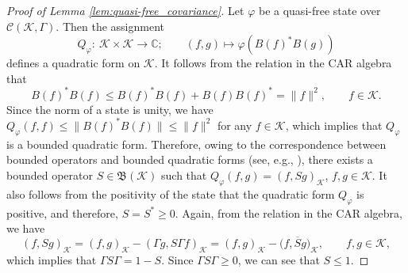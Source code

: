 \documentclass[pdftex]{sigma}
\numberwithin{equation}{section}
\newcommand{\mfrak}[1]{\mathfrak{#1}}
\newcommand{\mcal}[1]{\mathcal{#1}}
\newcommand{\mbb}[1]{\mathbb{#1}}
\begin{document}
\begin{proof}[Proof of Lemma \ref{lem:quasi-free_covariance}]
Let $\varphi$ be a quasi-free state over $\mcal{C}(\mcal{K},\Gamma)$.
Then the assignment
\begin{equation*}
	Q_{\varphi}\colon \ \mcal{K}\times \mcal{K}\to\mbb{C};\qquad (f,g)\mapsto \varphi (B(f)^{\ast}B(g))
\end{equation*}
defines a quadratic form on $\mcal{K}$.
It follows from the relation in the CAR algebra that
\begin{equation*}
	B(f)^{\ast}B(f)\le B(f)^{\ast}B(f)+B(f)B(f)^{\ast}=\|f\|^{2},\qquad f\in\mcal{K}.
\end{equation*}
Since the norm of a state is unity, we have $Q_{\varphi}(f,f)\le \|B(f)^{\ast}B(f)\|\le \|f\|^{2}$ for any $f\in\mcal{K}$, which implies that $Q_{\varphi}$ is a bounded quadratic form. Therefore, owing to the correspondence between bounded operators and bounded quadratic forms (see, e.g., \cite[Chapter~1]{Koshmanenko1999}), there exists a bounded operator $S\in \mfrak{B}(\mcal{K})$ such that $Q_{\varphi}(f,g)=(f,Sg)_{\mcal{K}}$, $f,g \in \mcal{K}$. It also follows from the positivity of the state that the quadratic form $Q_{\varphi}$ is positive, and therefore, $S=S^{\ast}\ge 0$. Again, from the relation in the CAR algebra, we have
\begin{equation*}
	(f,Sg)_{\mcal{K}}=(f,g)_{\mcal{K}}-(\Gamma g, S\Gamma f)_{\mcal{K}}=(f,g)_{\mcal{K}}-\big(f,\overline{S} g\big)_{\mcal{K}},\qquad f,g\in\mcal{K},
\end{equation*}
which implies that $\Gamma S \Gamma=1-S$. Since $\Gamma S \Gamma\ge 0$, we can see that $S\le 1$.


\end{proof}
\end{document}
